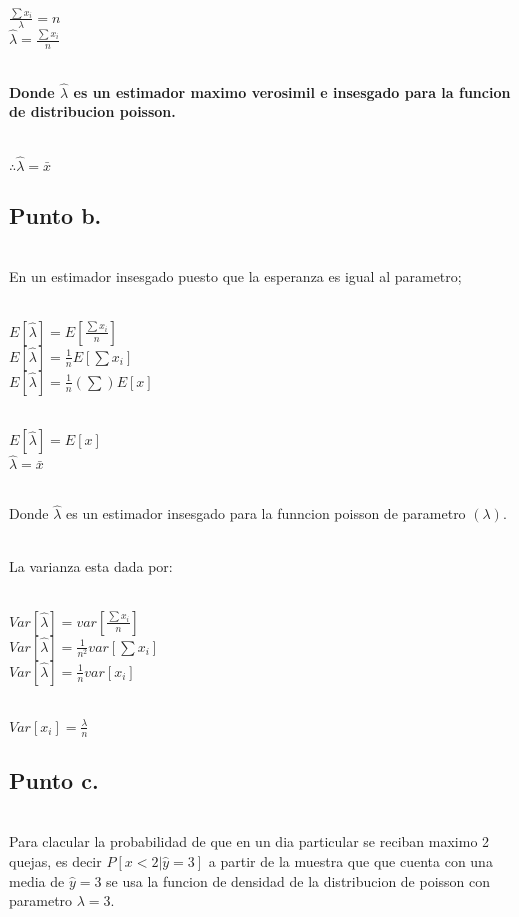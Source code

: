 \documentclass[letterpaper,12pt,onecolumn,titlepage]{article}
\begin{document}
~\\ $\frac{\sum{x_{i}}}{\lambda} = n $
~\\ $\hat{\lambda} = \frac{\sum{x_{i}}}{n}$

~\\ \textbf{Donde $\hat{\lambda}$ es un estimador maximo verosimil e insesgado para la funcion de distribucion poisson.} 
 
~\\ $\therefore \hat{\lambda} = \bar{x}$

\subsection{Punto b.}
~\\ En un estimador insesgado puesto que la esperanza es igual al parametro;

~\\ $E[\hat{\lambda}] = E[\frac{\sum{x_{i}}}{n}]$
~\\ $E[\hat{\lambda}] = \frac{1}{n}E[\sum{x_{i}}]$
~\\ $E[\hat{\lambda}] = \frac{1}{n}(\sum)E[x]$

~\\ $E[\hat{\lambda}] = E[x]$
~\\ $\hat{\lambda} = \bar{x}$

~\\ Donde $\hat{\lambda}$ es un estimador insesgado para la funncion poisson de parametro $(\lambda)$. 

~\\ La varianza esta dada por: 

~\\ $Var[\hat{\lambda}]= var[\frac{\sum{x_{i}}}{n}]$
~\\ $Var[\hat{\lambda}]= \frac{1}{n^2} var[\sum{x_{i}}]$
~\\ $Var[\hat{\lambda}]= \frac{1}{n} var[x_{i}]$

~\\ $Var[x_{i}]= \frac{\lambda}{n}$

\subsection{Punto c.}
~\\ Para clacular la probabilidad de que en un dia particular se reciban maximo 2 quejas, es decir $P[x<2|\hat{y}=3]$ a partir de la muestra que que cuenta con una media de $\hat{y}=3$ se usa la funcion de densidad de la distribucion de poisson con parametro $\lambda=3$. 
\end{document}
